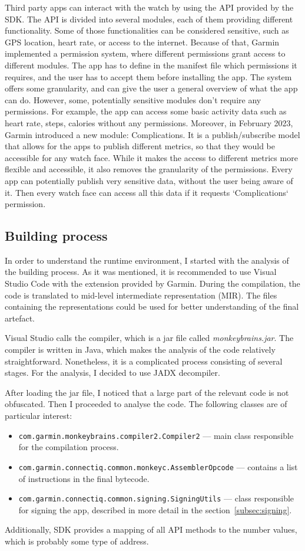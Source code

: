 Third party apps can interact with the watch by using the API provided by the SDK.
The API is divided into several modules, each of them providing different functionality.
Some of those functionalities can be considered sensitive, such as GPS location, heart rate, or access to the internet.
Because of that, Garmin implemented a permission system, where different permissions grant access to different modules.
The app has to define in the manifest file which permissions it requires, and the user has to accept them before installing the app.
The system offers some granularity, and can give the user a general overview of what the app can do.
However, some, potentially sensitive modules don't require any permissions.
For example, the app can access some basic activity data such as heart rate, steps, calories without any permissions.
Moreover, in February 2023, Garmin introduced a new module: Complications.
It is a publish/subscribe model that allows for the apps to publish different metrics, so that they would be accessible for any watch face.
While it makes the access to different metrics more flexible and accessible, it also removes the granularity of the permissions.
Every app can potentially publish very sensitive data, without the user being aware of it.
Then every watch face can access all this data if it requests `Complications` permission.

\subsection{Building process}
In order to understand the runtime environment, I started with the analysis of the building process.
As it was mentioned, it is recommended to use Visual Studio Code with the extension provided by Garmin.
During the compilation, the code is translated to mid-level intermediate representation (MIR).
The files containing the representations could be used for better understanding of the final artefact.

Visual Studio calls the compiler, which is a jar file called \textit{monkeybrains.jar}.
The compiler is written in Java, which makes the analysis of the code relatively straightforward.
Nonetheless, it is a complicated process consisting of several stages.
For the analysis, I decided to use JADX decompiler\cite{jadx}.

After loading the jar file, I noticed that a large part of the relevant code is not obfuscated.
Then I proceeded to analyse the code.
The following classes are of particular interest:
\begin{itemize}
    \item \texttt{com.garmin.monkeybrains.compiler2.Compiler2} — main class responsible for the compilation process.
    \item \texttt{com.garmin.connectiq.common.monkeyc.AssemblerOpcode} — contains a list of instructions in the final bytecode.
    \item \texttt{com.garmin.connectiq.common.signing.SigningUtils} — class responsible for signing the app, described in more detail in the section~\ref{subsec:signing}.
\end{itemize}
Additionally, SDK provides a mapping of all API methods to the number values, which is probably some type of address.


